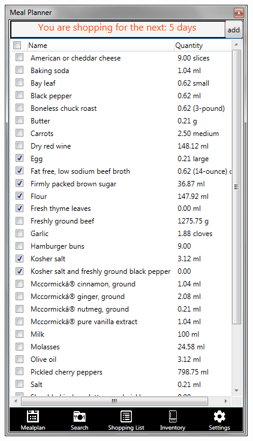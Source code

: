 \begin{figure}[H]
\begin{minipage}{.33\textwidth}
  \includegraphics[width=.9\linewidth]{Grafik/ShoppingListPage}
  \label{fig:ShoppingListPage}
\end{minipage}%
\end{figure}

